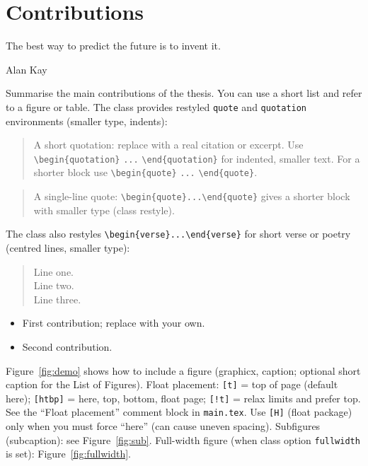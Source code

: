 
\section{Contributions}\label{sec:contributions}

\epigraph{The best way to predict the future is to invent it.}{Alan Kay}

Summarise the main contributions of the thesis. You can use a short list and refer to a figure or table. The class provides restyled \texttt{quote} and \texttt{quotation} environments (smaller type, indents):

\begin{quotation}
  A short quotation: replace with a real citation or excerpt. Use \verb|\begin{quotation}| \verb|...| \verb|\end{quotation}| for indented, smaller text. For a shorter block use \verb|\begin{quote}| \verb|...| \verb|\end{quote}|.
\end{quotation}

\begin{quote}
  A single-line quote: \verb|\begin{quote}...\end{quote}| gives a shorter block with smaller type (class restyle).
\end{quote}

The class also restyles \verb|\begin{verse}...\end{verse}| for short verse or poetry (centred lines, smaller type):
\begin{verse}
  Line one.\\
  Line two.\\
  Line three.
\end{verse}

\begin{itemize}
  \item First contribution; replace with your own.
  \item Second contribution.
\end{itemize}

Figure~\ref{fig:demo} shows how to include a figure (graphicx, caption; optional short caption for the List of Figures). Float placement: \texttt{[t]} = top of page (default here); \texttt{[htbp]} = here, top, bottom, float page; \texttt{[!t]} = relax limits and prefer top. See the ``Float placement'' comment block in \texttt{main.tex}. Use \texttt{[H]} (float package) only when you must force ``here'' (can cause uneven spacing). Subfigures (subcaption): see Figure~\ref{fig:sub}. Full-width figure (when class option \texttt{fullwidth} is set): Figure~\ref{fig:fullwidth}.

